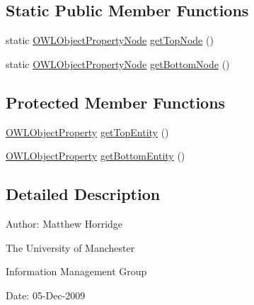 \subsection*{Static Public Member Functions}
\begin{DoxyCompactItemize}
\item 
static \hyperlink{classorg_1_1semanticweb_1_1owlapi_1_1reasoner_1_1impl_1_1_o_w_l_object_property_node}{O\-W\-L\-Object\-Property\-Node} \hyperlink{classorg_1_1semanticweb_1_1owlapi_1_1reasoner_1_1impl_1_1_o_w_l_object_property_node_a91801b15bcfcae3e11b1a70c50b86d95}{get\-Top\-Node} ()
\item 
static \hyperlink{classorg_1_1semanticweb_1_1owlapi_1_1reasoner_1_1impl_1_1_o_w_l_object_property_node}{O\-W\-L\-Object\-Property\-Node} \hyperlink{classorg_1_1semanticweb_1_1owlapi_1_1reasoner_1_1impl_1_1_o_w_l_object_property_node_a3fa4e0f0338b9882b7aba1f94432ba30}{get\-Bottom\-Node} ()
\end{DoxyCompactItemize}
\subsection*{Protected Member Functions}
\begin{DoxyCompactItemize}
\item 
\hyperlink{interfaceorg_1_1semanticweb_1_1owlapi_1_1model_1_1_o_w_l_object_property}{O\-W\-L\-Object\-Property} \hyperlink{classorg_1_1semanticweb_1_1owlapi_1_1reasoner_1_1impl_1_1_o_w_l_object_property_node_a9063a9b1829b267248e145bac897aa30}{get\-Top\-Entity} ()
\item 
\hyperlink{interfaceorg_1_1semanticweb_1_1owlapi_1_1model_1_1_o_w_l_object_property}{O\-W\-L\-Object\-Property} \hyperlink{classorg_1_1semanticweb_1_1owlapi_1_1reasoner_1_1impl_1_1_o_w_l_object_property_node_a91983833bf522b7509e4edebe91b417d}{get\-Bottom\-Entity} ()
\end{DoxyCompactItemize}


\subsection{Detailed Description}
Author\-: Matthew Horridge\par
 The University of Manchester\par
 Information Management Group\par
 Date\-: 05-\/\-Dec-\/2009 

